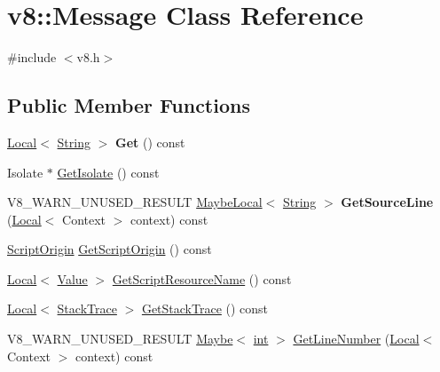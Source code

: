 \hypertarget{classv8_1_1Message}{}\section{v8\+:\+:Message Class Reference}
\label{classv8_1_1Message}


{\ttfamily \#include $<$v8.\+h$>$}

\subsection*{Public Member Functions}
\begin{DoxyCompactItemize}
\item 
\mbox{\label{classv8_1_1Message_a5bcbd1fa06dbbcf7cb880cb6760a4960}} 
\mbox{\hyperlink{classv8_1_1Local}{Local}}$<$ \mbox{\hyperlink{classv8_1_1String}{String}} $>$ {\bfseries Get} () const
\item 
Isolate $\ast$ \mbox{\hyperlink{classv8_1_1Message_a6058f54f4fc67c0370390ea1725b89af}{Get\+Isolate}} () const
\item 
\mbox{\label{classv8_1_1Message_a5343d0df6a79a51a38d8079a22c9eb4b}} 
V8\+\_\+\+W\+A\+R\+N\+\_\+\+U\+N\+U\+S\+E\+D\+\_\+\+R\+E\+S\+U\+LT \mbox{\hyperlink{classv8_1_1MaybeLocal}{Maybe\+Local}}$<$ \mbox{\hyperlink{classv8_1_1String}{String}} $>$ {\bfseries Get\+Source\+Line} (\mbox{\hyperlink{classv8_1_1Local}{Local}}$<$ Context $>$ context) const
\item 
\mbox{\hyperlink{classv8_1_1ScriptOrigin}{Script\+Origin}} \mbox{\hyperlink{classv8_1_1Message_a3530ffb45b802c46a47349e610402a3c}{Get\+Script\+Origin}} () const
\item 
\mbox{\hyperlink{classv8_1_1Local}{Local}}$<$ \mbox{\hyperlink{classv8_1_1Value}{Value}} $>$ \mbox{\hyperlink{classv8_1_1Message_ad6c8411095f39ec6022d880c9cbbc870}{Get\+Script\+Resource\+Name}} () const
\item 
\mbox{\hyperlink{classv8_1_1Local}{Local}}$<$ \mbox{\hyperlink{classv8_1_1StackTrace}{Stack\+Trace}} $>$ \mbox{\hyperlink{classv8_1_1Message_a14cf84edd3b137e9eef27a3a2f3675a8}{Get\+Stack\+Trace}} () const
\item 
V8\+\_\+\+W\+A\+R\+N\+\_\+\+U\+N\+U\+S\+E\+D\+\_\+\+R\+E\+S\+U\+LT \mbox{\hyperlink{classv8_1_1Maybe}{Maybe}}$<$ \mbox{\hyperlink{classint}{int}} $>$ \mbox{\hyperlink{classv8_1_1Message_aa274b764af674e656346c42d15aac691}{Get\+Line\+Number}} (\mbox{\hyperlink{classv8_1_1Local}{Local}}$<$ Context $>$ context) const

\end{DoxyCompactItemize}
